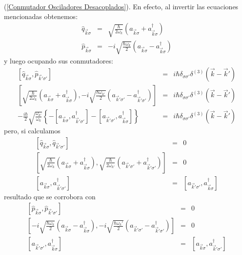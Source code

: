 (\ref{Conmutador Osciladores Desacoplados}). En efecto, al invertir las ecuaciones
mencionadas obtenemos:%
\begin{eqnarray}
\hat{q}_{\vec{k}\sigma} & = &\sqrt{\frac{\hbar}{2\omega_{k}}}\left(
a_{\vec{k}\sigma}+a_{\vec{k}\sigma}^{\dagger}\right) \\
\hat{p}_{\vec{k}\sigma} & = &-i\sqrt{\frac{\hbar \omega_{k}}{2}}\left(
a_{\vec{k}\sigma}-a_{\vec{k}\sigma}^{\dagger}\right)
\end{eqnarray}
y luego ocupando sus conmutadores:%
\begin{eqnarray}
\left[ \hat{q}_{\vec{k}\sigma},\hat{p}_{\vec{k}'\sigma'}\right] & = &i\hbar\delta_{\sigma\sigma'}\delta^{\left( 3\right) }\left( \vec{k}-\vec{k}'\right) \\
\left[ \sqrt{\frac{\hbar}{2\omega_{k}}}\left( a_{\vec{k}\sigma}+a_{\vec
{k}\sigma}^{\dagger}\right) ,-i\sqrt{\frac{\hbar \omega_{k'}}{2}}\left( a_{\vec{k}'\sigma '}-a_{\vec{k}'\sigma '}^{\dagger}\right) \right] & = &i\hbar\delta_{\sigma\sigma '}\delta^{\left( 3\right) }\left( \vec{k}-\vec{k}'\right) \\
-\frac{i\hbar}{2}\sqrt{\frac{\omega_{k'}}{\omega_{k}}}\left\{ -\left[ a_{\vec{k}\sigma},a_{\vec{k}'\sigma '}^{\dagger}\right] -\left[ a_{\vec{k}'\sigma '},a_{\vec{k}\sigma}^{\dagger}\right] \right\} & = &i\hbar\delta_{\sigma\sigma '}\delta^{\left( 3\right) }\left( \vec{k}-\vec{k}'\right)
\end{eqnarray}
pero, si calculamos%
\begin{eqnarray}
\left[ \hat{q}_{\vec{k}\sigma},\hat{q}_{\vec{k}'\sigma '}\right] & = &0\\
\left[ \sqrt{\frac{\hbar}{2\omega_{k}}}\left( a_{\vec{k}\sigma}+a_{\vec
{k}\sigma}^{\dagger}\right) ,\sqrt{\frac{\hbar}{2\omega_{k'}}}\left( a_{\vec{k}'\sigma '}+a_{\vec{k}'\sigma '}^{\dagger}\right) \right] & = &0\\
\left[ a_{\vec{k}\sigma},a_{\vec{k}'\sigma '}^{\dagger}\right] & = &\left[ a_{\vec{k}'\sigma '},a_{\vec{k}\sigma}^{\dagger}\right]
\end{eqnarray}
resultado que se corrobora con%
\begin{eqnarray}
\left[ \hat{p}_{\vec{k}\sigma},\hat{p}_{\vec{k}'\sigma '}\right] & = &0\\
\left[ -i\sqrt{\frac{\hbar \omega_{k}}{2}}\left( a_{\vec{k}\sigma}%
-a_{\vec{k}\sigma}^{\dagger}\right) ,-i\sqrt{\frac{\hbar \omega_{k}'}{2}}\left( a_{\vec{k}'\sigma '}-a_{\vec{k}'\sigma '}^{\dagger}\right) \right] & = &0\\
\left[ a_{\vec{k}'\sigma '},a_{\vec{k}\sigma}^{\dagger}\right] & = &\left[ a_{\vec{k}\sigma},a_{\vec{k}'\sigma '}^{\dagger}\right]
\end{eqnarray}
